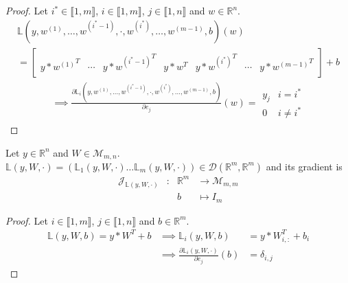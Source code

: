\documentclass[11pt,en]{elegantpaper}
\newcommand{\Real}{\mathbb{R}}
\begin{document}
\begin{proof}
  Let $i^* \in \llbracket 1,m \rrbracket$, $i \in \llbracket 1,m \rrbracket$, $j \in \llbracket 1,n \rrbracket$ and $w \in \Real^n$. \begin{equation*}
    \begin{gathered}
      \mathbb{L}(y,w^{(1)},\ldots,w^{(i^*-1)},\cdot,w^{(i^*)},\ldots,w^{(m-1)},b)(w) \\
      = \begin{bmatrix}
        y * {w^{(1)}}^T &
        \cdots &
        y * {w^{(i^*-1)}}^T &
        y * w^T &
        y * {w^{(i^*)}}^T &
        \cdots &
        y * {w^{(m-1)}}^T
      \end{bmatrix} + b
    \end{gathered}
  \end{equation*}
  \begin{equation*}
    \begin{gathered}
      \implies \frac{\partial \mathbb{L}_i(y,w^{(1)},\ldots,w^{(i^*-1)},\cdot,w^{(i^*)},\ldots,w^{(m-1)},b)}{\partial e_j} (w) = \begin{array}{ll}
        y_j & i = i^* \\
        0 & i \neq i^*
      \end{array}
    \end{gathered}
  \end{equation*}
\end{proof}

\begin{proposition}
  {\normalfont
    Let $y \in \Real^n$ and $W \in \mathcal{M}_{m,n}$.
    $\mathbb{L}(y,W,\cdot) = (\mathbb{L}_1(y,W,\cdot) \ldots \mathbb{L}_m(y,W,\cdot)) \in \mathcal{D}(\Real^m, \Real^m)$
    and its gradient is \begin{equation}\label{prop:densel_b_differential}
      \begin{array}{llll}
        \mathcal{J}_{\mathbb{L}(y,W,\cdot)} & : & \Real^m  & \longrightarrow \mathcal{M}_{m,m} \\
        &   & b & \longmapsto I_m
      \end{array}
    \end{equation}
  }
\end{proposition}

\begin{proof}
  Let $i \in \llbracket 1,m \rrbracket$, $j \in \llbracket 1,n \rrbracket$
  and $b \in \Real^m$. \begin{equation*}
    \begin{array}{lll}
      \mathbb{L}(y,W,b) = y * W^T + b & \implies \mathbb{L}_i(y,W,b) & = y * W_{i,:}^T + b_i \\
      & \implies \frac{\partial \mathbb{L}_i(y,W,\cdot)}{\partial e_j} (b) & = \delta_{i,j}
    \end{array}
  \end{equation*}
\end{proof}
\end{document}
